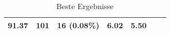 \begin{table}[h]
\begin{tabular}{|r|r|r|r|r|r|r|}
			91.37                                                                                                      & 101                                                                                               & 16  (0.08\%)                                                                                                                                                 & 6.02                                                                                                                                                     & \textbf{5.50}                                                                                   \\ \hline
			\end{tabular}
			\caption{Beste Ergebnisse}
			\label{tab:bestErgebnisse}
			\end{table}

